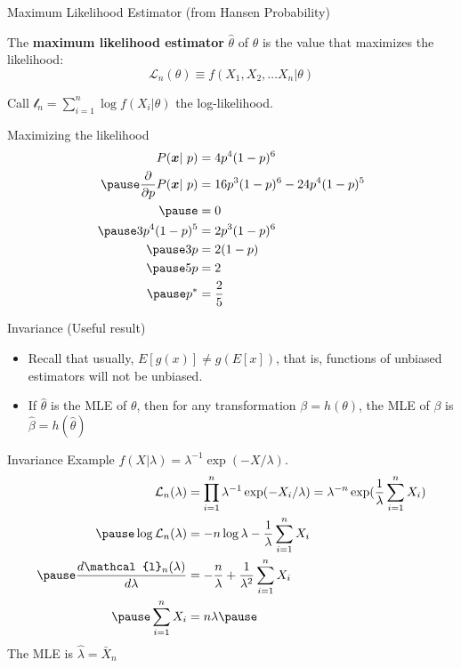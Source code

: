\documentclass[aspectratio=169, handout, t]{beamer}
\numberwithin{equation}{section}
\begin{document}
\begin{frame}{Maximum Likelihood Estimator (from Hansen Probability)}
\begin{definition}
The \textbf{maximum likelihood estimator} $\hat{\theta}$ of $\theta$ is the value that maximizes the likelihood: $$\mathcal{L}_n(\theta)\equiv f(X_1, X_2, \ldots X_n|\theta)$$
\end{definition}
Call $\mathcal{l}_n=\sum_{i=1}^n \log f(X_i|\theta)$ the log-likelihood.\\
\end{frame}

\begin{frame}{Maximizing the likelihood}
\begin{align*}
P(\bm{x}|\ p)&=4p^{4}(1-p)^{6}\\\pause
\frac{\partial}{\partial p}P(\bm{x}|\ p)&=16p^3(1-p)^6-24p^4(1-p)^5\\\pause
&=0\\\pause
3p^4(1-p)^5&=2p^3(1-p)^6\\\pause
3p&=2(1-p)\\\pause
5p&=2\\\pause
p^*&=\frac{2}{5}
\end{align*}
\end{frame}

\begin{frame}{Invariance (Useful result)}

\begin{itemize}
\item Recall that usually, $E[g(x)]\neq g(E[x])$, that is, functions of unbiased estimators will not be unbiased.
\item If $\hat{\theta}$ is the MLE of $\theta$, then for any transformation $\beta=h(\theta)$, the MLE of $\beta$ is $\hat{\beta}=h(\hat{\theta})$
\end{itemize}
\end{frame}

\begin{frame}{Invariance Example  $f(X|\lambda)=\lambda^{-1}\exp(-X/\lambda)$.}
\begin{align*}
\mathcal{L}_n(\lambda)&=\prod_{i=1}^n \lambda^{-1}\exp(-X_i/\lambda)=\lambda^{-n}\exp(\frac{1}{\lambda}\sum_{i=1}^n X_i)\\\pause
\log \mathcal{L}_n(\lambda)&=-n\log\lambda - \frac{1}{\lambda}\sum_{i=1}^n X_i\\\pause
\frac{d\mathcal{l}_n(\lambda)}{d\lambda}&=-\frac{n}{\lambda}+\frac{1}{\lambda^2}\sum_{i=1}^n X_i\\\pause
\sum_{i=1}^n X_i&=n\lambda\pause
\end{align*}
The MLE is $\hat{\lambda}=\bar{X}_n$
\end{frame}
\end{document}
